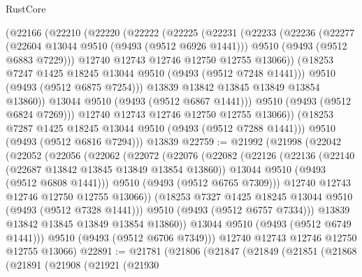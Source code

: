 \begin{lexlean}{RustCore}
\begin{coremodule}
        (@22166
          (@22210
            (@22220
              (@22222
                (@22225
                  (@22231
                    (@22233
                      (@22236
                        (@22277
                          (@22604 @13044 @9510 (@9493 (@9512 @6926 @1441)))
                          @9510
                          (@9493 (@9512 @6883 @7229)))
                        @12740
                        @12743
                        @12746
                        @12750
                        @12755
                        @13066))
                    (@18253 @7247 @1425 @18245 @13044 @9510 (@9493 (@9512 @7248 @1441)))
                    @9510
                    (@9493 (@9512 @6875 @7254)))
                  @13839
                  @13842
                  @13845
                  @13849
                  @13854
                  @13860))
              @13044
              @9510
              (@9493 (@9512 @6867 @1441)))
            @9510
            (@9493 (@9512 @6824 @7269)))
          @12740
          @12743
          @12746
          @12750
          @12755
          @13066))
      (@18253 @7287 @1425 @18245 @13044 @9510 (@9493 (@9512 @7288 @1441)))
      @9510
      (@9493 (@9512 @6816 @7294)))
    @13839
@22759 := @21992
    (@21998
      (@22042
        (@22052
          (@22056
            (@22062
              (@22072
                (@22076
                  (@22082
                    (@22126
                      (@22136
                        (@22140 (@22687 @13842 @13845 @13849 @13854 @13860))
                        @13044
                        @9510
                        (@9493 (@9512 @6808 @1441)))
                      @9510
                      (@9493 (@9512 @6765 @7309)))
                    @12740
                    @12743
                    @12746
                    @12750
                    @12755
                    @13066))
                (@18253 @7327 @1425 @18245 @13044 @9510 (@9493 (@9512 @7328 @1441)))
                @9510
                (@9493 (@9512 @6757 @7334)))
              @13839
              @13842
              @13845
              @13849
              @13854
              @13860))
          @13044
          @9510
          (@9493 (@9512 @6749 @1441)))
        @9510
        (@9493 (@9512 @6706 @7349)))
      @12740
      @12743
      @12746
      @12750
      @12755
      @13066)
@22891 := @21781
    (@21806
      (@21847
        (@21849
          (@21851
            (@21868
              (@21891
                (@21908
                  (@21921
                    (@21930

\end{coremodule}
\end{lexlean}
